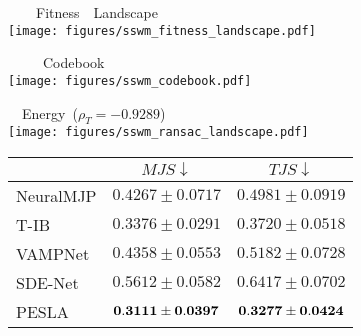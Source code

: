 \begin{minipage}{0.66\textwidth}
    \footnotesize    \subcaption{~~~~~~~~~~~~~~~~~~~~~~~~~~~~~~~~~~~~~~~~~~~~~~~~~~~~~~~~~~~~~~~~~~~~~~~~~~~~~~~~~~~~~~~~~~~~~~~~~~~~~~~~~~~~~~~~~~~~~~~~~~~~~~~~}\label{fig:sswm_data}
    \begin{minipage}{\textwidth}
    
        \begin{minipage}{0.32\textwidth}
            \centering ~~~~Fitness~~Landscape\\
            \texttt{[image: figures/sswm\_fitness\_landscape.pdf]}
        \end{minipage}
        \begin{minipage}{0.32\textwidth}
            \centering ~~~~~Codebook\\
            \texttt{[image: figures/sswm\_codebook.pdf]}
        \end{minipage}
         \begin{minipage}{0.32\textwidth}
            \centering ~~Energy~{\tiny ($\rho_T=-0.9289$)}\\
            \texttt{[image: figures/sswm\_ransac\_landscape.pdf]}
        \end{minipage}
        
    \end{minipage}
    
    \begin{minipage}{\textwidth}
        \setlength{\tabcolsep}{8pt}
        \renewcommand{\arraystretch}{1.2} %
        \fontsize{8}{15}
        \centering        \subcaption{~~~~~~~~~~~~~~~~~~~~~~~~~~~~~~~~~~~~~~~~~~~~~~~~~~~~~~~~~~~~~~~~~~~~~~~~~~~~~~~~~~~~~~~~~~~~~~~~~~~~~~~~~~~~~~~~~~~~~~~~~~~~~~~~}\label{tab:sswm_results}
        \begin{tabular}{l|cc}
            \hline
             & $MJS \downarrow$ & $TJS \downarrow$ \\
            \hline
            NeuralMJP & $0.4267\pm0.0717$ &  $0.4981\pm0.0919$ \\
            T-IB & $0.3376\pm0.0291$  &  $0.3720\pm0.0518$ \\
            VAMPNet & $0.4358\pm0.0553$  &  $0.5182\pm0.0728$  \\
            SDE-Net & $0.5612\pm0.0582$ & $0.6417\pm0.0702$ \\
            PESLA & $\bf{0.3111\pm0.0397}$ &  $\bf{0.3277\pm0.0424}$
            \\\hline           
        \end{tabular}
        
    \end{minipage}

\end{minipage}
